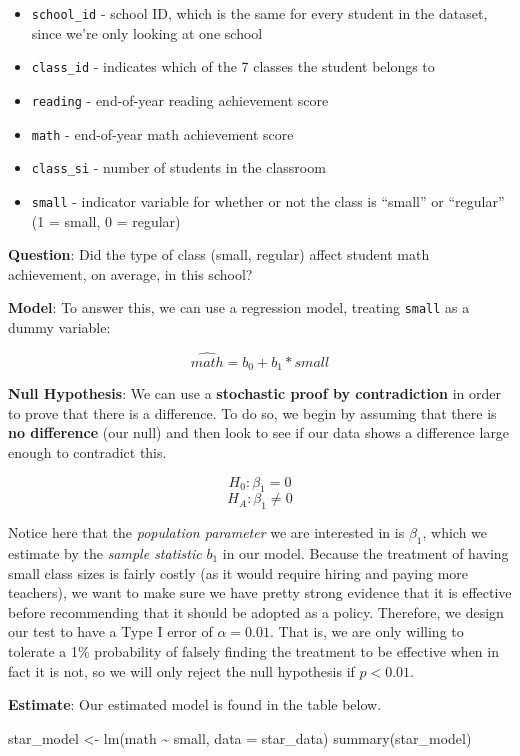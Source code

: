 \documentclass[
  letterpaper,
  DIV=11,
  numbers=noendperiod]{scrreprt}
\newenvironment{Shaded}{\begin{snugshade}}{\end{snugshade}}
\newcommand{\AttributeTok}[1]{\textcolor[rgb]{0.40,0.45,0.13}{#1}}
\newcommand{\FunctionTok}[1]{\textcolor[rgb]{0.28,0.35,0.67}{#1}}
\newcommand{\NormalTok}[1]{\textcolor[rgb]{0.00,0.23,0.31}{#1}}
\newcommand{\OtherTok}[1]{\textcolor[rgb]{0.00,0.23,0.31}{#1}}
\newcommand{\SpecialCharTok}[1]{\textcolor[rgb]{0.37,0.37,0.37}{#1}}
\providecommand{\tightlist}{%
  \setlength{\itemsep}{0pt}\setlength{\parskip}{0pt}}\usepackage{longtable,booktabs,array}
\theoremstyle{definition}
\theoremstyle{remark}
\begin{document}
\begin{itemize}
\tightlist
\item
  \texttt{school\_id} - school ID, which is the same for every student
  in the dataset, since we're only looking at one school
\item
  \texttt{class\_id} - indicates which of the 7 classes the student
  belongs to
\item
  \texttt{reading} - end-of-year reading achievement score
\item
  \texttt{math} - end-of-year math achievement score
\item
  \texttt{class\_si} - number of students in the classroom
\item
  \texttt{small} - indicator variable for whether or not the class is
  ``small'' or ``regular'' (1 = small, 0 = regular)
\end{itemize}

\textbf{Question}: Did the type of class (small, regular) affect student
math achievement, on average, in this school?

\textbf{Model}: To answer this, we can use a regression model, treating
\texttt{small} as a dummy variable:

\[\widehat{math} = b_0 + b_1*small\]

\textbf{Null Hypothesis}: We can use a \textbf{stochastic proof by
contradiction} in order to prove that there is a difference. To do so,
we begin by assuming that there is \textbf{no difference} (our null) and
then look to see if our data shows a difference large enough to
contradict this.

\[H_0: \beta_1 = 0\] \[H_A: \beta_1 \neq 0\]

Notice here that the \emph{population parameter} we are interested in is
\(\beta_1\), which we estimate by the \emph{sample statistic} \(b_1\) in
our model. Because the treatment of having small class sizes is fairly
costly (as it would require hiring and paying more teachers), we want to
make sure we have pretty strong evidence that it is effective before
recommending that it should be adopted as a policy. Therefore, we design
our test to have a Type I error of \(\alpha = 0.01\). That is, we are
only willing to tolerate a 1\% probability of falsely finding the
treatment to be effective when in fact it is not, so we will only reject
the null hypothesis if \(p < 0.01.\)

\textbf{Estimate}: Our estimated model is found in the table below.

\begin{Shaded}
\begin{Highlighting}[]
\NormalTok{star\_model }\OtherTok{\textless{}{-}} \FunctionTok{lm}\NormalTok{(math }\SpecialCharTok{\textasciitilde{}}\NormalTok{ small, }\AttributeTok{data =}\NormalTok{ star\_data)}
\FunctionTok{summary}\NormalTok{(star\_model)}
\end{Highlighting}
\end{Shaded}
\end{document}
